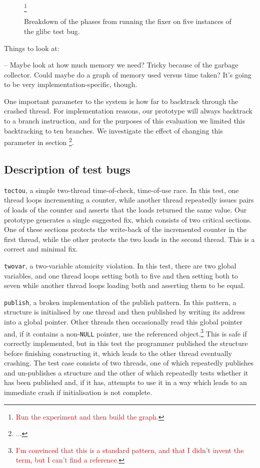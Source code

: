 \documentclass[10pt,twocolumn,preprint,natbib,authoryear]{sigplanconf}
\newcommand{\editorial}[1]{\textcolor{red}{\footnote{\textcolor{red}{#1}}}}
\begin{document}
\begin{figure*}
\editorial{Run the experiment and then build the graph.}
\caption{Breakdown of the phases from running the fixer on five instances
  of the glibc test bug.}
\end{figure*}

Things to look at:

-- Maybe look at how much memory we need?  Tricky because of the
garbage collector.  Could maybe do a graph of memory used versus time
taken?  It's going to be very implementation-specific, though.

One important parameter to the system is how far to backtrack through
the crashed thread.  For implementation reasons, our prototype will
always backtrack to a branch instruction, and for the purposes of this
evaluation we limited this backtracking to ten branches.  We
investigate the effect of changing this parameter in section
\editorial{...}.

\subsection{Description of test bugs}

\verb|toctou|, a simple two-thread time-of-check, time-of-use race.
In this test, one thread loops incrementing a counter, while another
thread repeatedly issues pairs of loads of the counter and asserts
that the loads returned the same value.  Our prototype generates a
single suggested fix, which consists of two critical sections.  One of
these sections protects the write-back of the incremented counter in
the first thread, while the other protects the two loads in the second
thread.  This is a correct and minimal fix.

\verb|twovar|, a two-variable atomicity violation.  In this test,
there are two global variables, and one thread loops setting both to
five and then setting both to seven while another thread loops loading
both and asserting them to be equal.

\verb|publish|, a broken implementation of the publish pattern.  In
this pattern, a structure is initialised by one thread and then
published by writing its address into a global pointer.  Other threads
then occasionally read this global pointer and, if it contains a
non-\verb|NULL| pointer, use the referenced object.\editorial{I'm
  convinced that this is a standard pattern, and that I didn't invent
  the term, but I can't find a reference.}  This is safe if correctly
implemented, but in this test the programmer published the structure
before finishing constructing it, which leads to the other thread
eventually crashing.  The test case consists of two threads, one of
which repeatedly publishes and un-publishes a structure and the other
of which repeatedly tests whether it has been published and, if it
has, attempts to use it in a way which leads to an immediate crash if
initialisation is not complete.
\end{document}
